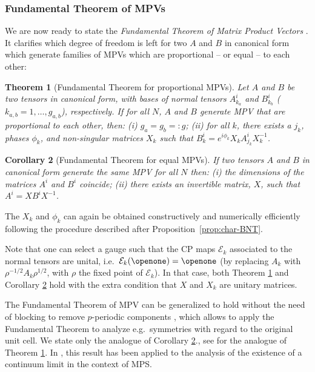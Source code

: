 \documentclass[rmp,aps,reprint,superscriptaddress,nobalancelastpage]{revtex4-1}
\newtheorem{thm}{Theorem}[section]
\newtheorem{cor}[thm]{Corollary}
\begin{document}
    \subsubsection{Fundamental Theorem of MPVs}


    We are now ready to state the \emph{Fundamental Theorem of Matrix Product Vectors} \cite{cirac:mpdo-rgfp}. It clarifies which degree of freedom is left for two $A$ and $B$ in canonical form which generate families of MPVs which are proportional -- or equal -- to each other:
    \begin{thm}[Fundamental Theorem for proportional MPVs]
        \label{thm1}
        Let $A$ and $B$ be two tensors in canonical form, with bases of normal tensors $A^i_{k_a}$ and $B^i_{k_b}$ ($k_{a,b}=1,\dots,g_{a,b}$), respectively. If for all $N$, $A$ and $B$ generate MPV that are proportional to each other, then: (i) $g_a=g_b=:g$; (ii) for all $k$, there exists a $j_k$, phases $\phi_{k}$, and non-singular matrices $X_{k}$ such that $B^i_{k}=e^{i\phi_{k}}X_{k}A^i_{j_k}X_{k}^{-1}$.
    \end{thm}

    \begin{cor}[Fundamental Theorem for equal MPVs]
        \label{II_cor2}
        If two tensors $A$ and $B$ in canonical form generate the same MPV for all $N$ then: (i) the dimensions of the matrices $A^i$ and $B^i$ coincide; (ii) there exists an invertible matrix, $X$, such that
        $A^i = X B^i X^{-1}$.
    \end{cor}
    The $X_k$ and $\phi_k$ can again be obtained constructively and numerically efficiently following the procedure described after
    Proposition~\ref{prop:char-BNT}.


    Note that one can select a gauge such that
    the CP maps $\mathcal{E}_k$ associated to the normal tensors are unital, i.e.\ $\mathcal E_k(\openone)=\openone$ (by replacing $A_k$ with $\rho^{-1/2}A_k \rho^{1/2}$, with $\rho$ the fixed point of $\mathcal E_k$). In that case, both Theorem \ref{thm1} and Corollary \ref{II_cor2} hold with the extra condition that $X$ and $X_k$ are unitary matrices.

    The Fundamental Theorem of MPV can be generalized to hold without the need of blocking to remove $p$-periodic components \cite{delascuevas:fund-thm-periodic}, which allows to apply the Fundamental Theorem to analyze e.g.\ symmetries with regard to the original unit cell.
    We state only the analogue of Corollary \ref{II_cor2}., see \textcite{delascuevas:fund-thm-periodic} for the analogue of Theorem \ref{thm1}. In \textcite{delascuevas:mps-cont-limit}, this result has been applied to the analysis of the existence of a continuum limit in the context of MPS.
\end{document}

